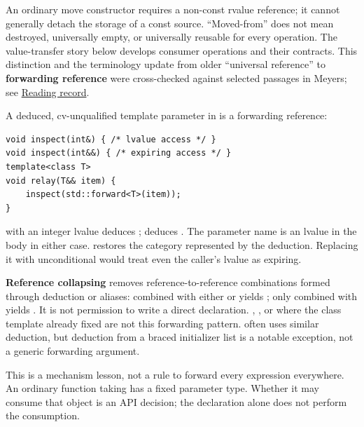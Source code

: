 An ordinary  move constructor requires a non-const rvalue reference; it cannot generally detach the storage of a const source. ``Moved-from'' does not mean destroyed, universally empty, or universally reusable for every operation. The value-transfer story below develops consumer operations and their contracts. This distinction and the terminology update from older ``universal reference'' to \textbf{forwarding reference} were cross-checked against selected passages in Meyers; see \hyperref[appendix-a103e7846d21-m008---borrowing-categories-and-const-access]{Reading record}.

A deduced, cv-unqualified template parameter in  is a forwarding reference:

\begin{verbatim}
void inspect(int&) { /* lvalue access */ }
void inspect(int&&) { /* expiring access */ }
template<class T>
void relay(T&& item) {
    inspect(std::forward<T>(item));
}
\end{verbatim}

 with an integer lvalue deduces ;  deduces . The parameter name  is an lvalue in the body in either case.  restores the category represented by the deduction. Replacing it with unconditional  would treat even the caller's lvalue as expiring.

\textbf{Reference collapsing} removes reference-to-reference combinations formed through deduction or aliases: \BookInlineCode{\&} combined with either \BookInlineCode{\&} or \BookInlineCode{\&\&} yields \BookInlineCode{\&}; only \BookInlineCode{\&\&} combined with \BookInlineCode{\&\&} yields \BookInlineCode{\&\&}. It is not permission to write a direct  declaration. , , or  where the class template already fixed  are not this forwarding pattern.  often uses similar deduction, but deduction from a braced initializer list is a notable exception, not a generic forwarding argument.

This is a mechanism lesson, not a rule to forward every expression everywhere. An ordinary function taking  has a fixed parameter type. Whether it may consume that object is an API decision; the declaration alone does not perform the consumption.

